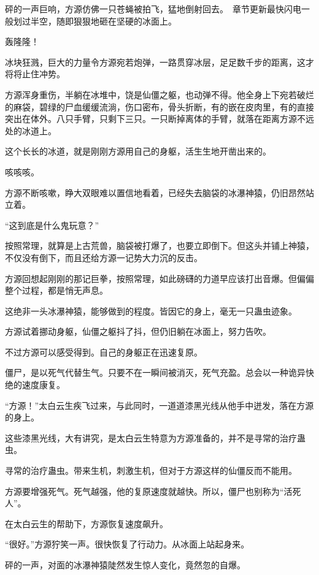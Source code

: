 
\begin{this_body}

砰的一声巨响，方源仿佛一只苍蝇被拍飞，猛地倒射回去。　章节更新最快闪电一般划过半空，随即狠狠地砸在坚硬的冰面上。

轰隆隆！

冰块狂溅，巨大的力量令方源宛若炮弹，一路贯穿冰层，足足数千步的距离，这才将将止住冲势。

方源浑身重伤，半躺在冰堆中，饶是仙僵之躯，也动弹不得。他全身上下宛若破烂的麻袋，碧绿的尸血缓缓流淌，伤口密布，骨头折断，有的嵌在皮肉里，有的直接突出在体外。八只手臂，只剩下三只。一只断掉离体的手臂，就落在距离方源不远处的冰道上。

这个长长的冰道，就是刚刚方源用自己的身躯，活生生地开凿出来的。

咳咳咳。

方源不断咳嗽，睁大双眼难以置信地看着，已经失去脑袋的冰瀑神猿，仍旧昂然站立着。

“这到底是什么鬼玩意？”

按照常理，就算是上古荒兽，脑袋被打爆了，也要立即倒下。但这头并铺上神猿，不仅没有倒下，而且还给方源一记势大力沉的反击。

方源回想起刚刚的那记巨拳，按照常理，如此磅礴的力道早应该打出音爆。但偏偏整个过程，都是悄无声息。

这绝非一头冰瀑神猿，能够做到的程度。皆因它的身上，毫无一只蛊虫迹象。

方源试着挪动身躯，仙僵之躯抖了抖，但仍旧躺在冰面上，努力告吹。

不过方源可以感受得到。自己的身躯正在迅速复原。

僵尸，是以死气代替生气。只要不在一瞬间被消灭，死气充盈。总会以一种诡异快绝的速度康复。

“方源！”太白云生疾飞过来，与此同时，一道道漆黑光线从他手中迸发，落在方源的身上。

这些漆黑光线，大有讲究，是太白云生特意为方源准备的，并不是寻常的治疗蛊虫。

寻常的治疗蛊虫。带来生机，刺激生机，但对于方源这样的仙僵反而不能用。

方源要增强死气。死气越强，他的复原速度就越快。所以，僵尸也别称为“活死人”。

在太白云生的帮助下，方源恢复速度飙升。

“很好。”方源狞笑一声。很快恢复了行动力。从冰面上站起身来。

砰的一声，对面的冰瀑神猿陡然发生惊人变化，竟然忽的自爆。


\end{this_body}
